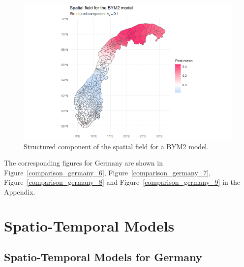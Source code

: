 \begin{figure}[H]
  \centering
  \includegraphics[width = \textwidth]{spatial_field_norway_4.png}
  \caption{Structured component of the spatial field for a BYM2 model.}
  \label{comparison_norway_9}
\end{figure}
The corresponding figures for Germany are shown in Figure~\ref{comparison_germany_6}, Figure~\ref{comparison_germany_7}, Figure~\ref{comparison_germany_8} and Figure~\ref{comparison_germany_9} in the Appendix. \\
\clearpage
\section{Spatio-Temporal Models}
\subsection{Spatio-Temporal Models for Germany}
